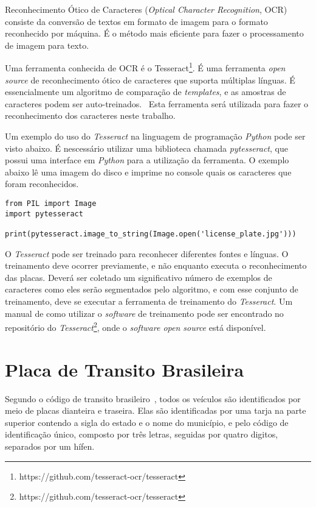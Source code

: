 Reconhecimento Ótico de Caracteres (\emph{Optical Character Recognition}, OCR)
consiste da conversão de textos em formato de imagem para o formato reconhecido
por máquina. É o método mais eficiente para fazer o processamento de imagem para
texto.~\cite{mohit2015designing}

Uma ferramenta conhecida de OCR é o
Tesseract\footnote{https://github.com/tesseract-ocr/tesseract}. É uma ferramenta
\emph{open source} de reconhecimento ótico de caracteres que suporta múltiplas
línguas.  É essencialmente um algoritmo de comparação de \emph{templates}, e as
amostras de caracteres podem ser auto-treinados.~\cite{ho2016intelligent} Esta
ferramenta será utilizada para fazer o reconhecimento dos caracteres neste trabalho.

Um exemplo do uso do \emph{Tesseract} na linguagem de programação \emph{Python} pode ser
visto abaixo. É nescessário utilizar uma biblioteca chamada \emph{pytesseract}, que possui
uma interface em \emph{Python} para a utilização da ferramenta. O exemplo abaixo lê uma
imagem do disco e imprime no console quais os caracteres que foram reconhecidos.

\begin{verbatim}
from PIL import Image
import pytesseract

print(pytesseract.image_to_string(Image.open('license_plate.jpg')))
\end{verbatim}

O \emph{Tesseract} pode ser treinado para reconhecer diferentes fontes e línguas. O
treinamento deve ocorrer previamente, e não enquanto executa o reconhecimento das placas.
Deverá ser coletado um significativo número de exemplos de caracteres como eles serão segmentados
pelo algoritmo, e com esse conjunto de treinamento, deve se executar a ferramenta de treinamento do
\emph{Tesseract}. Um manual de como utilizar o \emph{software} de treinamento pode ser encontrado
no repositório do \emph{Tesseract}\footnote{https://github.com/tesseract-ocr/tesseract}, onde o
\emph{software open source} está disponível.


\section{Placa de Transito Brasileira}
\label{sec:placabr}

Segundo o código de transito brasileiro~\cite{brasil1997lei}, todos os veículos
são identificados por meio de placas dianteira e traseira. Elas são
identificadas por uma tarja na parte superior contendo a sigla do estado e o
nome do município, e pelo código de identificação único, composto por três
letras, seguidas por quatro digitos, separados por um hífen.

